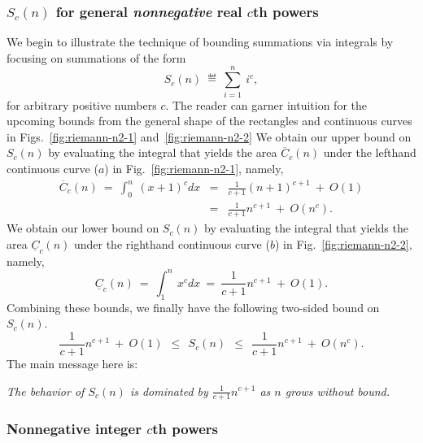 \subsubsection{$S_c(n)$ for general {\em nonnegative} real $c$th powers}
\label{sec:sum-of-i2c>0}

We begin to illustrate the technique of bounding summations via
integrals by focusing on summations of the form
\[ S_c(n) \ \eqdef \ \sum_{i=1}^n \ i^c, \]
for arbitrary positive numbers $c$.  The reader can garner intuition
for the upcoming bounds from the general shape of the rectangles and
continuous curves in Figs.~\ref{fig:riemann-n2-1}
and~\ref{fig:riemann-n2-2} We obtain our upper bound on $S_c(n)$ by
evaluating the integral that yields the area $\overline{C}_c(n)$ under
the lefthand continuous curve ($a$) in Fig.~\ref{fig:riemann-n2-1},
namely,
\begin{eqnarray}
\label{eq:upper-integral-xc}
\overline{C}_c(n) \ = \
\int_0^n \ (x+1)^c dx & = &
 \frac{1}{c+1} (n+1)^{c+1} \ + \ O(1) \\
\nonumber
 & = & \frac{1}{c+1} n^{c+1} \ + \ O(n^c).
\end{eqnarray}
We obtain our lower bound on $S_c(n)$ by evaluating the integral that
yields the area $\underline{C}_c(n)$ under the righthand continuous
curve ($b$) in Fig.~\ref{fig:riemann-n2-2}, namely,
\begin{equation}
\label{eq:lower-integral-xc}
\underline{C}_c(n) \ = \
\int_1^n \ x^c dx \ = \ \frac{1}{c+1} n^{c+1} \ + \ O(1).
\end{equation}
Combining these bounds, we finally have the following two-sided bound
on $S_c(n)$.
\begin{equation}
\label{eq:bounds-sum-xc}
\frac{1}{c+1} n^{c+1} \ + \ O(1)
  \ \ \leq \ \ S_c(n)
  \ \ \leq \ \ \frac{1}{c+1} n^{c+1} \ + \ O(n^c).
\end{equation}
The main message here is:
\begin{center}
{\em The behavior of $S_c(n)$ is dominated by $\displaystyle
  \frac{1}{c+1} n^{c+1}$ as $n$ grows without bound.  }
\end{center}


\subsubsection{Nonnegative integer $c$th powers}
\label{sec:positive-integer-power}

